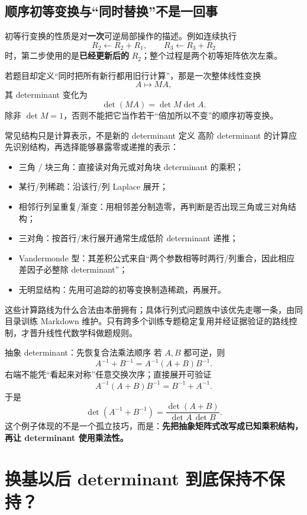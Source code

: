 \documentclass[11pt,a4paper]{ctexart}
\newcommand{\kw}[1]{\textbf{\color{deep}#1}}
\begin{document}
\subsection{顺序初等变换与“同时替换”不是一回事}

初等行变换的性质是对\kw{一次}可逆局部操作的描述。例如连续执行
\[
R_2\leftarrow R_2+R_1,
\qquad
R_3\leftarrow R_3+R_2
\]
时，第二步使用的是\kw{已经更新后的} $R_2$；整个过程是两个初等矩阵依次左乘。

若题目却定义“同时把所有新行都用旧行计算”，那是一次整体线性变换
\[
A\mapsto MA,
\]
其 determinant 变化为
\[
\det(MA)=\det M\det A.
\]
除非 $\det M=1$，否则不能把它当作若干“倍加所以不变”的顺序初等变换。

\begin{methodbox}{常见结构只是计算表示，不是新的 determinant 定义}
高阶 determinant 的计算应先识别结构，再选择能够暴露零或递推的表示：
\begin{itemize}
  \item 三角 / 块三角：直接读对角元或对角块 determinant 的乘积；
  \item 某行/列稀疏：沿该行/列 Laplace 展开；
  \item 相邻行列呈重复/渐变：用相邻差分制造零，再判断是否出现三角或三对角结构；
  \item 三对角：按首行/末行展开通常生成低阶 determinant 递推；
  \item Vandermonde 型：其差积公式来自“两个参数相等时两行/列重合，因此相应差因子必整除 determinant”；
  \item 无明显结构：先用可追踪的初等变换制造稀疏，再展开。
\end{itemize}
这些计算路线为什么合法由本册拥有；具体行列式问题族中该优先走哪一条，由同目录训练 Markdown 维护。只有跨多个训练专题稳定复用并经证据验证的路线控制，才晋升线性代数学科做题规则。
\end{methodbox}

\begin{examplebox}{抽象 determinant：先恢复合法乘法顺序}
若 $A,B$ 都可逆，则
\[
A^{-1}+B^{-1}
=A^{-1}(A+B)B^{-1}.
\]
右端不能凭“看起来对称”任意交换次序；直接展开可验证
\[
A^{-1}(A+B)B^{-1}
=B^{-1}+A^{-1}.
\]
于是
\[
\det(A^{-1}+B^{-1})
=\frac{\det(A+B)}{\det A\,\det B}.
\]
这个例子体现的不是一个孤立技巧，而是：\kw{先把抽象矩阵式改写成已知乘积结构，再让 determinant 使用乘法性。}
\end{examplebox}

\section{换基以后 determinant 到底保持不保持？}
\end{document}
